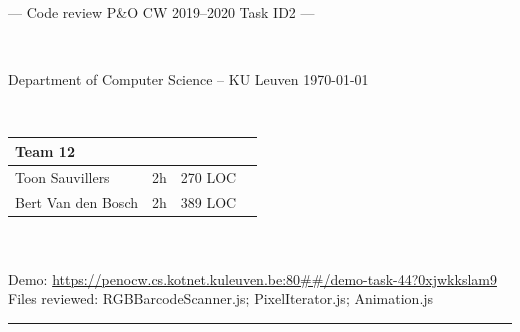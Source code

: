 \documentclass[a4paper,11pt]{article}
\begin{document}
\noindent
\colorbox[HTML]{52BDEC}{\bfseries\parbox{\textwidth}{\centering\large
  --- Code review P\&O CW 2019--2020 Task ID2 ---
}}
\\[-1mm]
\colorbox[HTML]{00407A}{\bfseries\color{white}\parbox{\textwidth}{
  Department of Computer Science -- KU Leuven
  \hfill
  \today
}}
\\

\smallskip

\noindent
\begin{tabular}{*4l}
\toprule
\multicolumn{3}{l}{\large\textbf{Team 12}} \\
\midrule
Toon Sauvillers & 2h & 270 LOC \\ %
Bert Van den Bosch & 2h & 389 LOC \\
\bottomrule
\hline
\end{tabular}\\
\\
Demo: \url{https://penocw.cs.kotnet.kuleuven.be:80##/demo-task-44?0xjwkkslam9} \\
Files reviewed: RGBBarcodeScanner.js; PixelIterator.js; Animation.js	

\noindent
{\color[HTML]{52BDEC} \rule{\linewidth}{1mm} }

\smallskip
\end{document}
